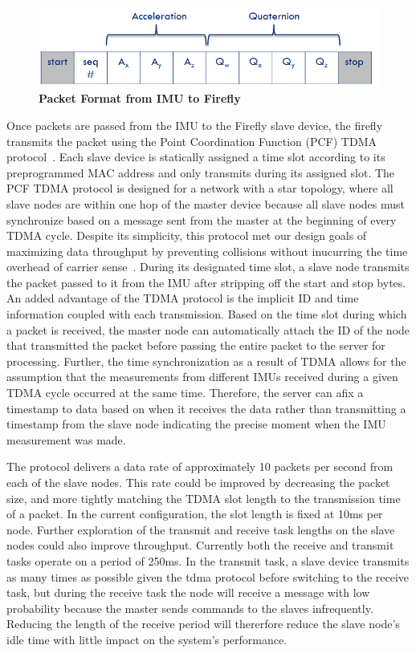 \documentclass[conference]{IEEEtran}
\begin{document}
\begin{figure}[h]
  \centering
  \includegraphics[width=0.8\columnwidth]{figs/packet}
  \caption{{\bf Packet Format from IMU to Firefly}}
  \label{fig:packet}
\end{figure}


Once packets are passed from the IMU to the Firefly slave device, the firefly transmits
the packet using the Point Coordination Function (PCF) TDMA protocol~\cite{pcf}. Each
slave device is statically assigned a time slot according to its preprogrammed MAC address
and only transmits during its assigned slot. The PCF TDMA protocol is designed for a
network with a star topology, where all slave nodes are within one hop of the master
device because all slave nodes must synchronize based on a message sent from the master at
the beginning of every TDMA cycle.  Despite its simplicity, this protocol met our design
goals of maximizing data throughput by preventing collisions without inucurring the time
overhead of carrier sense~\cite{CSMA}.  During its designated time slot, a slave node
transmits the packet passed to it from the IMU after stripping off the start and stop
bytes. An added advantage of the TDMA protocol is the implicit ID and time information
coupled with each transmission. Based on the time slot during which a packet is received,
the master node can automatically attach the ID of the node that transmitted the packet
before passing the entire packet to the server for processing. Further, the time
synchronization as a result of TDMA allows for the assumption that the measurements from
different IMUs received during a given TDMA cycle occurred at the same time. Therefore,
the server can afix a timestamp to data based on when it receives the data rather than
transmitting a timestamp from the slave node indicating the precise moment when the IMU
measurement was made. 

The protocol delivers a data rate of approximately 10 packets per second from each of
the slave nodes. This rate could be improved by decreasing the packet size, and more
tightly matching the TDMA slot length to the transmission time of a packet. In the current
configuration, the slot length is fixed at 10ms per node. Further exploration of the
transmit and receive task lengths on the slave nodes could also improve throughput.
Currently both the receive and transmit tasks operate on a period of 250ms. In the
transmit task, a slave device transmits as many times as possible given the tdma protocol
before switching to the receive task, but during the receive task the node will receive a
message with low probability because the master sends commands to the slaves infrequently.
Reducing the length of the receive period will thererfore reduce the slave node's idle
time with little impact on the system's performance. 
\end{document}
